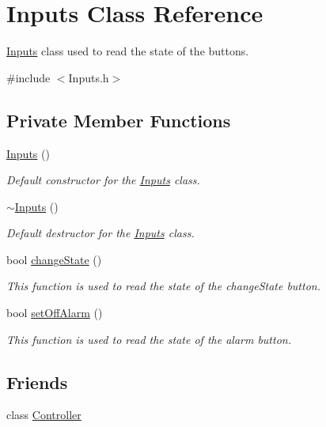 \hypertarget{classInputs}{}\section{Inputs Class Reference}
\label{classInputs}


\hyperlink{classInputs}{Inputs} class used to read the state of the buttons.  




{\ttfamily \#include $<$Inputs.\+h$>$}

\subsection*{Private Member Functions}
\begin{DoxyCompactItemize}
\item 
\hyperlink{classInputs_abd859d2c8a001153eb26aeeac263ed3d}{Inputs} ()
\begin{DoxyCompactList}\small\item\em Default constructor for the \hyperlink{classInputs}{Inputs} class. \end{DoxyCompactList}\item 
\hyperlink{classInputs_a721935d4549a704e944c056227214ca5}{$\sim$\+Inputs} ()
\begin{DoxyCompactList}\small\item\em Default destructor for the \hyperlink{classInputs}{Inputs} class. \end{DoxyCompactList}\item 
bool \hyperlink{classInputs_a44cce4556cf69290e76ed0195956a95d}{change\+State} ()
\begin{DoxyCompactList}\small\item\em This function is used to read the state of the change\+State button. \end{DoxyCompactList}\item 
bool \hyperlink{classInputs_a28390ec77ba03612f444292e5a13642a}{set\+Off\+Alarm} ()
\begin{DoxyCompactList}\small\item\em This function is used to read the state of the alarm button. \end{DoxyCompactList}\end{DoxyCompactItemize}
\subsection*{Friends}
\begin{DoxyCompactItemize}
\item 
class \hyperlink{classInputs_ac3456fd331a58b288082abca310c7a99}{Controller}
\end{DoxyCompactItemize}


